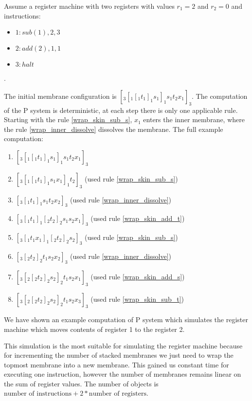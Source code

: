 \documentclass[submission,copyright,creativecommons]{../lib/lncs/llncs}
\begin{document}
\begin{example}
  Assume a register machine with two registers with values $r_1=2$ and $r_2=0$ and instructions:
  \begin{itemize}
    \item $1: sub(1),2,3$
    \item $2: add(2),1,1$
    \item $3: halt$
  \end{itemize}.

  The initial membrane configuration is $[_3 [_1 [_1 t_1 ]_1 s_1 ]_1 s_1 t_2 x_1 ]_3$. The computation of the P system is deterministic, at each step there is only one applicable rule. Starting with the rule \ref{wrap_skin_sub_s}, $x_1$ enters the inner membrane, where the rule \ref{wrap_inner_dissolve} dissolves the membrane. The full example computation:

  \begin{enumerate}
    \item $[_3 [_1 [_1 t_1 ]_1 s_1 ]_1 s_1 t_2 x_1 ]_3$
    \item $[_3 [_1 [_1 t_1 ]_1 s_1 x_1 ]_1 t_2 ]_3$ (used rule \ref{wrap_skin_sub_s})
    \item $[_3 [_1 t_1 ]_1 s_1 t_2 x_2 ]_3$ (used rule \ref{wrap_inner_dissolve})
    \item $[_3 [_1 t_1 ]_1 [_2 t_2 ]_2 s_1 s_2 x_1 ]_3$ (used rule \ref{wrap_skin_add_t})
    \item $[_3 [_1 t_1 x_1 ]_1 [_2 t_2 ]_2 s_2 ]_3$ (used rule \ref{wrap_skin_sub_s})
    \item $[_3 [_2 t_2 ]_2 t_1 s_2 x_2 ]_3$ (used rule \ref{wrap_inner_dissolve})
    \item $[_3 [_2 [_2 t_2 ]_2 s_2 ]_2 t_1 s_2 x_1 ]_3$ (used rule \ref{wrap_skin_add_s})
    \item $[_3 [_2 [_2 t_2 ]_2 s_2 ]_2 t_1 s_2 x_3 ]_3$ (used rule \ref{wrap_skin_sub_t})
  \end{enumerate}

  We have shown an example computation of P system which simulates the register machine which moves contents of register 1 to the register 2.
\end{example}

This simulation is the most suitable for simulating the register machine because for incrementing the number of stacked membranes we just need to wrap the topmost membrane into a new membrane. This gained us constant time for executing one instruction, however the number of membranes remains linear on the sum of register values. The number of objects is $\text{number of instructions} + 2 * \text{number of registers}$.
\end{document}
